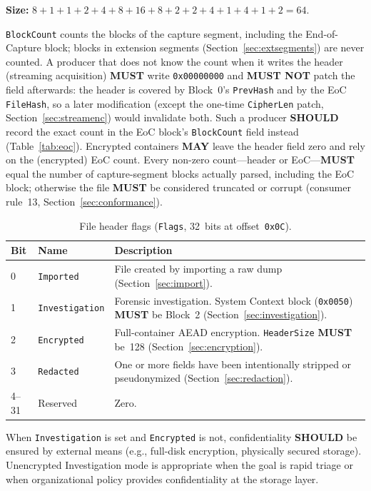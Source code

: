 \documentclass[11pt,a4paper]{article}
\newcommand{\MUST}{\textbf{MUST}}
\newcommand{\MUSTNOT}{\textbf{MUST NOT}}
\newcommand{\SHOULD}{\textbf{SHOULD}}
\newcommand{\MAY}{\textbf{MAY}}
\newcommand{\hex}[1]{\texttt{0x#1}}
\newcommand{\field}[1]{\texttt{#1}}
\begin{document}
\noindent\textbf{Size:} $8{+}1{+}1{+}2{+}4{+}8{+}16{+}8{+}2{+}2{+}4{+}1{+}4{+}1{+}2=64$.

\begin{notebox}[title={BlockCount semantics}]
\field{BlockCount} counts the blocks of the capture segment, including the End-of-Capture block; blocks in extension segments (Section~\ref{sec:extsegments}) are never counted. A producer that does not know the count when it writes the header (streaming acquisition) \MUST{} write \hex{00000000} and \MUSTNOT{} patch the field afterwards: the header is covered by Block~0's \field{PrevHash} and by the EoC \field{FileHash}, so a later modification (except the one-time \field{CipherLen} patch, Section~\ref{sec:streamenc}) would invalidate both. Such a producer \SHOULD{} record the exact count in the EoC block's \field{BlockCount} field instead (Table~\ref{tab:eoc}). Encrypted containers \MAY{} leave the header field zero and rely on the (encrypted) EoC count. Every non-zero count---header or EoC---\MUST{} equal the number of capture-segment blocks actually parsed, including the EoC block; otherwise the file \MUST{} be considered truncated or corrupt (consumer rule~13, Section~\ref{sec:conformance}).
\end{notebox}

\begin{table}[H]\centering\caption{File header flags (\field{Flags}, 32~bits at offset~\hex{0C}).}\label{tab:hdrflags}\small
\begin{tabular}{l l p{8.5cm}}\toprule\textbf{Bit}&\textbf{Name}&\textbf{Description}\\\midrule
0 & \field{Imported} & File created by importing a raw dump (Section~\ref{sec:import}). \\
1 & \field{Investigation} & Forensic investigation. System Context block (\hex{0050}) \MUST{} be Block~2 (Section~\ref{sec:investigation}). \\
2 & \field{Encrypted} & Full-container AEAD encryption. \field{HeaderSize} \MUST{} be~128 (Section~\ref{sec:encryption}). \\
3 & \field{Redacted} & One or more fields have been intentionally stripped or pseudonymized (Section~\ref{sec:redaction}). \\
4--31 & Reserved & Zero. \\
\bottomrule\end{tabular}\end{table}

\noindent When \field{Investigation} is set and \field{Encrypted} is not, confidentiality \SHOULD{} be ensured by external means (e.g., full-disk encryption, physically secured storage). Unencrypted Investigation mode is appropriate when the goal is rapid triage or when organizational policy provides confidentiality at the storage layer.
\end{document}
